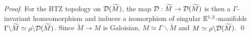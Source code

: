 \begin{proof}
 For the BTZ topology on $\mathcal{D}(\widetilde M)$, the map $\mathcal{D} : \widetilde M \rightarrow \mathcal{D}(\widetilde M)$ is then a $\Gamma$-invariant homeomorphism and induces a isomorphism of singular ${\mathbb E}^{1,2}_{}$-manifolds $\Gamma\backslash\widetilde M\simeq \rho\backslash\mathcal{D}(\widetilde M) $. Since $\widetilde M \rightarrow M$ is Galoisian, $M\simeq \Gamma\backslash\widetilde M$ and 
$M\simeq\rho\backslash\mathcal{D}(\widetilde M)$.
\qed\end{proof}


   
	




 
% 
% 
